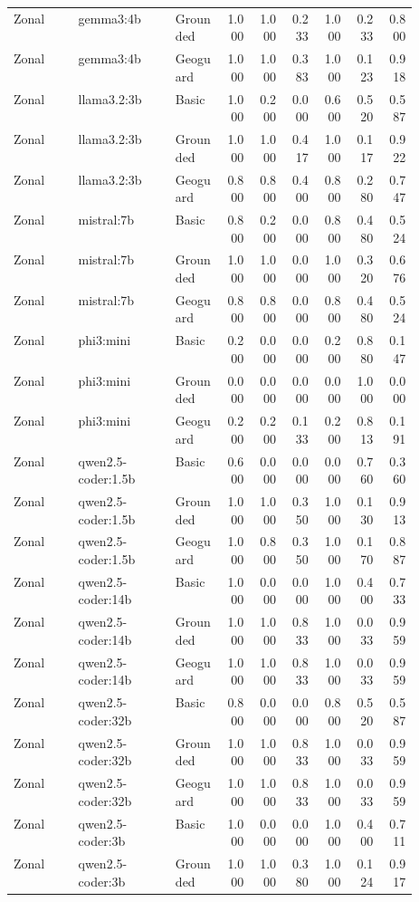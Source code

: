 \begin{longtable}{p{0.16\linewidth}p{0.24\linewidth}p{0.12\linewidth}rrrrrr}
Zonal & gemma3:4b & Grounded & 1.000 & 1.000 & 0.233 & 1.000 & 0.233 & 0.800 \\
Zonal & gemma3:4b & Geoguard & 1.000 & 1.000 & 0.383 & 1.000 & 0.123 & 0.918 \\
Zonal & llama3.2:3b & Basic & 1.000 & 0.200 & 0.000 & 0.600 & 0.520 & 0.587 \\
Zonal & llama3.2:3b & Grounded & 1.000 & 1.000 & 0.417 & 1.000 & 0.117 & 0.922 \\
Zonal & llama3.2:3b & Geoguard & 0.800 & 0.800 & 0.400 & 0.800 & 0.280 & 0.747 \\
Zonal & mistral:7b & Basic & 0.800 & 0.200 & 0.000 & 0.800 & 0.480 & 0.524 \\
Zonal & mistral:7b & Grounded & 1.000 & 1.000 & 0.000 & 1.000 & 0.320 & 0.676 \\
Zonal & mistral:7b & Geoguard & 0.800 & 0.800 & 0.000 & 0.800 & 0.480 & 0.524 \\
Zonal & phi3:mini & Basic & 0.200 & 0.000 & 0.000 & 0.200 & 0.880 & 0.147 \\
Zonal & phi3:mini & Grounded & 0.000 & 0.000 & 0.000 & 0.000 & 1.000 & 0.000 \\
Zonal & phi3:mini & Geoguard & 0.200 & 0.200 & 0.133 & 0.200 & 0.813 & 0.191 \\
Zonal & qwen2.5-coder:1.5b & Basic & 0.600 & 0.000 & 0.000 & 0.000 & 0.760 & 0.360 \\
Zonal & qwen2.5-coder:1.5b & Grounded & 1.000 & 1.000 & 0.350 & 1.000 & 0.130 & 0.913 \\
Zonal & qwen2.5-coder:1.5b & Geoguard & 1.000 & 0.800 & 0.350 & 1.000 & 0.170 & 0.887 \\
Zonal & qwen2.5-coder:14b & Basic & 1.000 & 0.000 & 0.000 & 1.000 & 0.400 & 0.733 \\
Zonal & qwen2.5-coder:14b & Grounded & 1.000 & 1.000 & 0.833 & 1.000 & 0.033 & 0.959 \\
Zonal & qwen2.5-coder:14b & Geoguard & 1.000 & 1.000 & 0.833 & 1.000 & 0.033 & 0.959 \\
Zonal & qwen2.5-coder:32b & Basic & 0.800 & 0.000 & 0.000 & 0.800 & 0.520 & 0.587 \\
Zonal & qwen2.5-coder:32b & Grounded & 1.000 & 1.000 & 0.833 & 1.000 & 0.033 & 0.959 \\
Zonal & qwen2.5-coder:32b & Geoguard & 1.000 & 1.000 & 0.833 & 1.000 & 0.033 & 0.959 \\
Zonal & qwen2.5-coder:3b & Basic & 1.000 & 0.000 & 0.000 & 1.000 & 0.400 & 0.711 \\
Zonal & qwen2.5-coder:3b & Grounded & 1.000 & 1.000 & 0.380 & 1.000 & 0.124 & 0.917 \\

\end{longtable}
